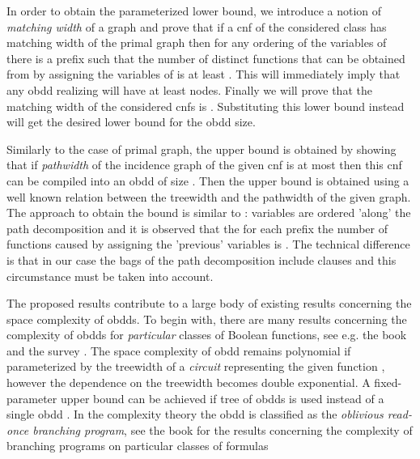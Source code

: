 \documentclass{article}
\begin{document}
\begin{comment}
Our motivation to consider these questions comes from the knowledge compilation perspective.
Indeed, according to \cite{DerMar}, {\sc obdd} can be thought as a special case of {\sc dnnf}
and stronger formalisms such as {\sc dnnf} \cite{DarwicheJACM} and {\sc sdd} \cite{SDD} are known to be size 
{\sc fpt} parameterized by the treewidht of the input {\sc cnf}. Therefore, in order to completely
classify the subclasses w.r.t this parameterization, it is important to understand it regarding
{\sc obdd}. To the best of our knowledge the lower bound reported in this paper is the first one 
ruling out the possibility of fixed-parameter size 
{\sc obdd}s for {\sc cnf}s with a fixed treewidth. 
\end{comment}


In order to obtain the parameterized lower bound, we introduce a notion of \emph{matching width} of a graph
and prove that if a {\sc cnf}  of the considered class
has matching width  of the primal graph then for any ordering of the variables of 
there is a prefix  such that the number of distinct functions that can be obtained 
from  by assigning the variables of  is at least .
This will immediately imply that any {\sc obdd} realizing
 will have at least  nodes. Finally we will prove that the matching width of the considered
{\sc cnf}s is . Substituting this lower bound instead  will get the
desired lower bound for the {\sc obdd} size. 

Similarly to the case of primal graph, the upper bound is obtained by showing that if \emph{pathwidth}
of the incidence graph of the given {\sc cnf} is at most  then this {\sc cnf} can be compiled into 
an {\sc obdd} of size . Then the  upper bound is obtained using a well known relation
 between the treewidth and the pathwidth of the given graph. The approach to obtain the 
 bound is similar to \cite{VardiTWD}: variables are ordered 'along' the path decomposition
and it is observed that the for each prefix the number of functions caused by assigning the 'previous'
variables is . The technical difference is that in our case the bags of the path decomposition
include clauses and this circumstance must be taken into account. 

The proposed results contribute to a large body of existing results concerning the space complexity
of {\sc obdd}s. To begin with, there are many results concerning the complexity of {\sc obdd}s for 
\emph{particular} classes of Boolean functions, see e.g. the book \cite{WegBook} and the survey \cite{WegSurvey}. 
The space complexity of {\sc obdd} remains polynomial if parameterized by the treewidth of a \emph{circuit} representing the given 
function \cite{OBDDTWJha}, however the dependence on the treewidth becomes double exponential. 
A fixed-parameter upper bound can be achieved if tree of {\sc obdd}s is used instead of a single
{\sc obdd} \cite{McMillan94,SubbaTree}. In the complexity theory the {\sc obdd} is classified
as the \emph{oblivious read-once branching program}, see the book \cite{Yukna} for the results concerning the
complexity of branching programs on particular classes of formulas
\end{document}
